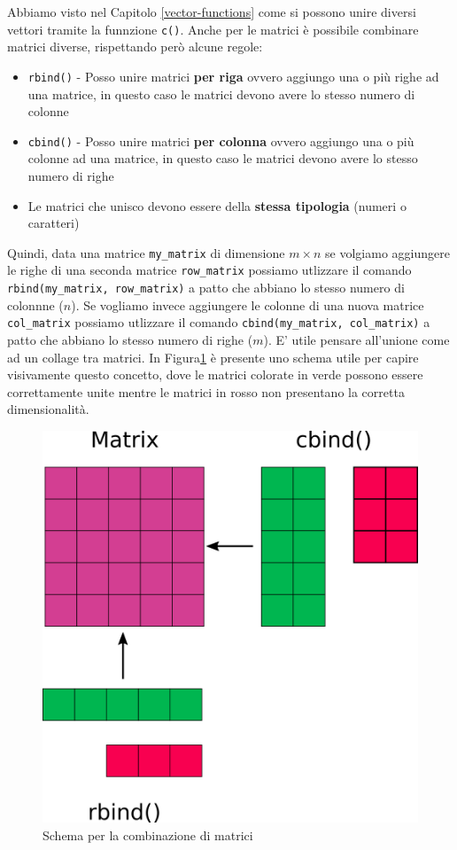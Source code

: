 \documentclass[
]{book}
\providecommand{\tightlist}{%
  \setlength{\itemsep}{0pt}\setlength{\parskip}{0pt}}
\begin{document}
Abbiamo visto nel Capitolo \ref{vector-functions} come si possono unire diversi vettori tramite la funnzione \texttt{c()}. Anche per le matrici è possibile combinare matrici diverse, rispettando però alcune regole:

\begin{itemize}
\tightlist
\item
  \texttt{rbind()} - Posso unire matrici \textbf{per riga} ovvero aggiungo una o più righe ad una matrice, in questo caso le matrici devono avere lo stesso numero di colonne
\item
  \texttt{cbind()} - Posso unire matrici \textbf{per colonna} ovvero aggiungo una o più colonne ad una matrice, in questo caso le matrici devono avere lo stesso numero di righe
\item
  Le matrici che unisco devono essere della \textbf{stessa tipologia} (numeri o caratteri)
\end{itemize}

Quindi, data una matrice \texttt{my\_matrix} di dimensione \(m \times n\) se volgiamo aggiungere le righe di una seconda matrice \texttt{row\_matrix} possiamo utlizzare il comando \texttt{rbind(my\_matrix,\ row\_matrix)} a patto che abbiano lo stesso numero di colonnne (\(n\)). Se vogliamo invece aggiungere le colonne di una nuova matrice \texttt{col\_matrix} possiamo utlizzare il comando \texttt{cbind(my\_matrix,\ col\_matrix)} a patto che abbiano lo stesso numero di righe (\(m\)). E' utile pensare all'unione come ad un collage tra matrici. In Figura\ref{fig:mat-comb} è presente uno schema utile per capire visivamente questo concetto, dove le matrici colorate in verde possono essere correttamente unite mentre le matrici in rosso non presentano la corretta dimensionalità.

\begin{figure}

{\centering \includegraphics[width=0.5\linewidth]{images/matrix_comb} 

}

\caption{Schema per la combinazione di matrici}\label{fig:mat-comb}
\end{figure}
\end{document}
